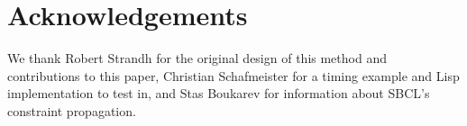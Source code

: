\section{Acknowledgements}

We thank Robert Strandh for the original design of this method and
contributions to this paper, Christian Schafmeister for a timing
example and Lisp implementation to test in, and Stas Boukarev for
information about SBCL's constraint propagation.
